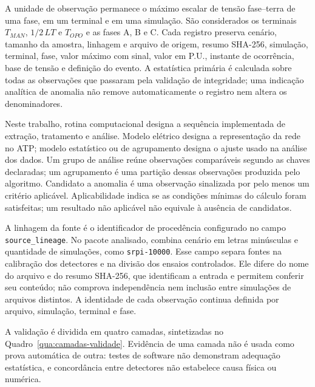 \documentclass[
	12pt,				%
	openright,			%
	oneside,			%
	a4paper,			%
	chapter=TITLE,		%
	section=TITLE,		%
	subsection=TITLE,	%
	subsubsection=TITLE,%
	english,			%
	brazilian			%
	]{abntex2}
\theoremstyle{definition}
\begin{document}
A unidade de observação permanece o máximo escalar de tensão fase--terra de
uma fase, em um terminal e em uma simulação. São considerados os terminais
$T_{MAN}$, $1/2\,LT$ e $T_{OPO}$ e as fases A, B e C. Cada registro preserva
cenário, tamanho da amostra, linhagem e arquivo de origem, resumo SHA-256,
simulação, terminal, fase, valor máximo com sinal, valor em P.U., instante de
ocorrência, base de tensão e definição do evento. A estatística primária é
calculada sobre todas as observações que passaram pela validação de
integridade; uma indicação analítica de anomalia não remove automaticamente o
registro nem altera os denominadores.

Neste trabalho, rotina computacional designa a sequência implementada de
extração, tratamento e análise. Modelo elétrico designa a representação da
rede no ATP; modelo estatístico ou de agrupamento designa o ajuste usado
na análise dos dados. Um grupo de análise reúne observações comparáveis
segundo as chaves declaradas; um agrupamento é uma partição dessas
observações produzida pelo algoritmo. Candidato a anomalia é uma observação
sinalizada por pelo menos um critério aplicável. Aplicabilidade indica se
as condições mínimas do cálculo foram satisfeitas; um resultado não
aplicável não equivale à ausência de candidatos.

A linhagem da fonte é o identificador de procedência configurado no campo
\texttt{source\_lineage}. No pacote analisado, combina cenário em letras
minúsculas e quantidade de simulações, como \texttt{srpi-10000}. Esse campo
separa fontes na calibração dos detectores e na divisão dos ensaios
controlados. Ele difere do nome do arquivo e do resumo SHA-256, que
identificam a entrada e permitem conferir seu conteúdo; não comprova
independência nem inclusão entre simulações de arquivos distintos. A
identidade de cada observação continua definida por arquivo, simulação,
terminal e fase.

A validação é dividida em quatro camadas, sintetizadas no
Quadro~\ref{qua:camadas-validade}. Evidência de uma camada não é usada como
prova automática de outra: testes de software não demonstram adequação
estatística, e concordância entre detectores não estabelece causa física
ou numérica.
\end{document}
